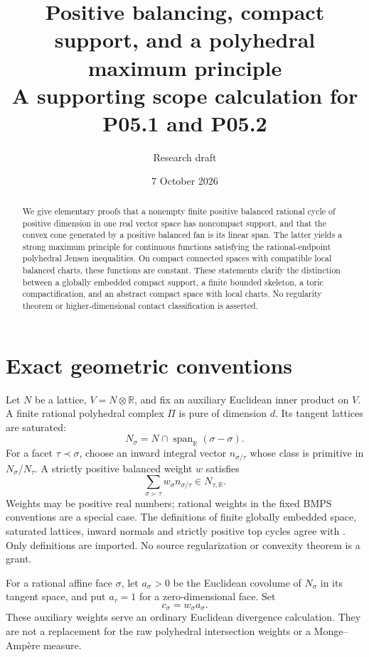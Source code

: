 \documentclass[11pt]{article}
\title{Positive balancing, compact support, and a polyhedral maximum principle\\\large A supporting scope calculation for P05.1 and P05.2}
\author{Research draft}
\date{7 October 2026}
\newcommand{\R}{\mathbb R}
\begin{document}
\maketitle
\begin{abstract}
We give elementary proofs that a nonempty finite positive balanced rational cycle of positive dimension in one real vector space has noncompact support, and that the convex cone generated by a positive balanced fan is its linear span. The latter yields a strong maximum principle for continuous functions satisfying the rational-endpoint polyhedral Jensen inequalities. On compact connected spaces with compatible local balanced charts, these functions are constant. These statements clarify the distinction between a globally embedded compact support, a finite bounded skeleton, a toric compactification, and an abstract compact space with local charts. No regularity theorem or higher-dimensional contact classification is asserted.
\end{abstract}

\section{Exact geometric conventions}
Let $N$ be a lattice, $V=N\otimes\R$, and fix an auxiliary Euclidean inner product on $V$. A finite rational polyhedral complex $\Pi$ is pure of dimension $d$. Its tangent lattices are saturated:
\[N_\sigma=N\cap\operatorname{span}_{\R}(\sigma-\sigma).
\]
For a facet $\tau\prec\sigma$, choose an inward integral vector $n_{\sigma/\tau}$ whose class is primitive in $N_\sigma/N_\tau$. A strictly positive balanced weight $w$ satisfies
\begin{equation}\label{balance}
\sum_{\sigma\succ\tau}w_\sigma n_{\sigma/\tau}\in N_{\tau,\R}.
\end{equation}
Weights may be positive real numbers; rational weights in the fixed BMPS conventions are a special case. The definitions of finite globally embedded space, saturated lattices, inward normals and strictly positive top cycles agree with \cite[Definitions 2.1--2.4, 2.18--2.27]{BMPS}. Only definitions are imported. No source regularization or convexity theorem is a grant.

For a rational affine face $\sigma$, let $a_\sigma>0$ be the Euclidean covolume of $N_\sigma$ in its tangent space, and put $a_\tau=1$ for a zero-dimensional face. Set
\[c_\sigma=w_\sigma a_\sigma.
\]
These auxiliary weights serve an ordinary Euclidean divergence calculation. They are not a replacement for the raw polyhedral intersection weights or a Monge--Amp\`ere measure.
\end{document}
